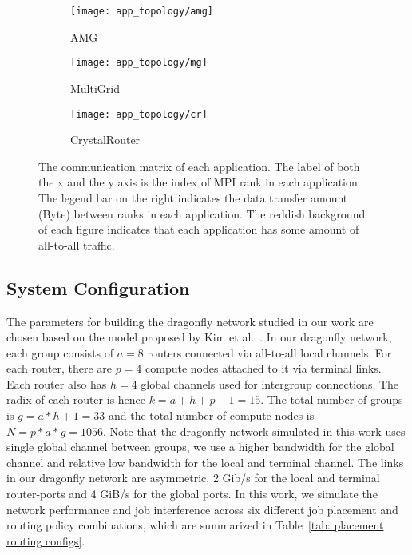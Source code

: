 \begin{figure*}[t!]
    \centering
    \begin{subfigure}[t]{0.32\textwidth}
        \centering
        \texttt{[image: app\_topology/amg]}
        \caption{AMG}
        \label{fig:amg-communication-topology}
    \end{subfigure}%
    \hspace{1em}%
    \begin{subfigure}[t]{0.32\textwidth}
        \centering
        \texttt{[image: app\_topology/mg]}
        \caption{MultiGrid}
        \label{fig:mg-communication-topology}
    \end{subfigure}%
    \hspace{1em}%
    \begin{subfigure}[t]{0.32\textwidth}
        \centering
        \texttt{[image: app\_topology/cr]}
        \caption{CrystalRouter}
        \label{fig:cr-communication-topology}
    \end{subfigure}%
    \caption{
The communication matrix of each application. The label of both the x and the y axis is the index of MPI rank in each application. 
The legend bar on the right indicates the data transfer amount (Byte) between ranks in each application. The reddish background of each figure indicates that each application has some amount of all-to-all traffic.
}
   \label{fig:applications_communication_matrix}
\end{figure*}






\subsection{System Configuration}
\label{sec: simulation configuration}

The parameters for building the dragonfly network studied in our work are chosen based on the model proposed by Kim et al.~\cite{kim-micro}. 
In our dragonfly network, each group consists of $a = 8$ routers connected via all-to-all local channels. For each router, there are $p = 4$ compute nodes attached to it via terminal links. Each router also has $h = 4$ global channels used for intergroup connections. The radix of each router is hence $k = a+h+p-1 = 15$. 
The total number of groups is $g = a*h+1 = 33 $ and the total number of compute nodes is $N = p*a*g = 1056$. 
Note that the dragonfly network simulated in this work uses single global channel between groups, we use a higher bandwidth for the global channel and relative low bandwidth for the local and terminal channel.
The links in our dragonfly network are asymmetric, 2 Gib/s for the local and terminal router-ports and 4 GiB/s for the global ports.
In this work, we simulate the network performance and job interference across six different job placement and routing policy combinations, which are summarized in Table~\ref{tab: placement routing configs}.

